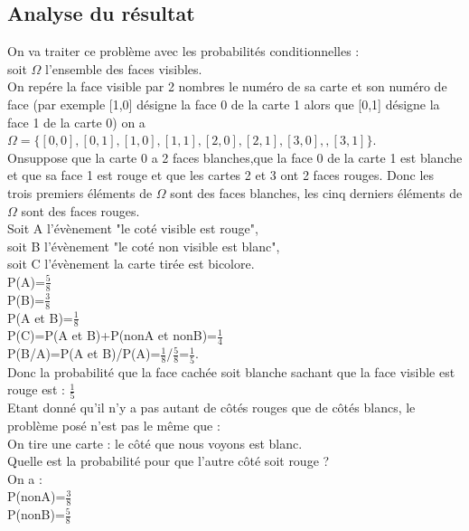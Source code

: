 \documentclass[a4paper,11pt]{book}
\begin{document}
\subsection{Analyse du r\'esultat}
On va traiter ce probl\`eme avec les probabilit\'es conditionnelles :\\
soit $\Omega$ l'ensemble des faces visibles. \\
On  rep\'ere la face visible par 
2 nombres le num\'ero de sa carte et son num\'ero de face (par exemple [1,0] 
d\'esigne la face 0 de la carte 1  alors que  
[0,1] d\'esigne la face 1 de la carte 0) on a \\
 $\Omega=\{[0,0],[0,1],[1,0],[1,1],[2,0],[2,1],[3,0],,[3,1]\}$.\\ 
Onsuppose que la carte 0 a 2 faces blanches,que la face 0 de la carte 1 est
blanche et que sa face 1 est rouge et que les cartes 2 et 3 ont 2 faces rouges.
Donc les trois premiers \'el\'ements de $\Omega$ sont des faces blanches, les 
cinq derniers \'el\'ements de $\Omega$ sont des faces rouges.\\
Soit A l'\'ev\`enement "le cot\'e visible est rouge",\\
soit B l'\'ev\`enement "le cot\'e non visible est blanc",\\
soit C l'\'ev\`enement la carte tir\'ee est bicolore.\\
P(A)=$\displaystyle \frac{5}{8}$\\
P(B)=$\displaystyle \frac{3}{8}$ \\  
P(A et B)=$\displaystyle \frac{1}{8}$\\
P(C)=P(A et B)+P(nonA et nonB)=$\displaystyle \frac{1}{4}$\\
P(B/A)=P(A et B)/P(A)=$\displaystyle \frac{1}{8}$/$\displaystyle \frac{5}{8}$=$\displaystyle \frac{1}{5}$.\\
Donc la probabilit\'e que la face cach\'ee soit blanche sachant que la face 
visible est rouge est :
 $\displaystyle\frac{1}{5}$\\
Etant donn\'e qu'il n'y a pas autant de c\^ot\'es rouges que de c\^ot\'es  
blancs, le probl\`eme pos\'e n'est pas le m\^eme que :\\
On tire une carte : le c\^ot\'e que nous voyons est blanc.\\
Quelle est la probabilit\'e pour que l'autre c\^ot\'e soit rouge ?\\
On a :\\
P(nonA)=$\displaystyle \frac{3}{8}$\\   
P(nonB)=$\displaystyle \frac{5}{8}$\\ 
\end{document}
